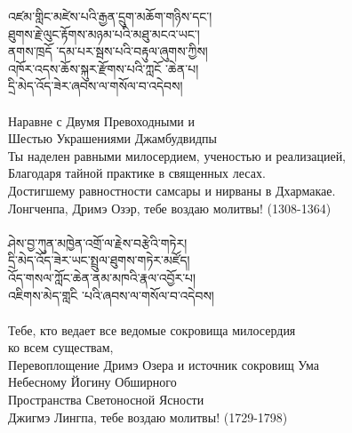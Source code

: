 {\ti
འཛམ་གླིང་མཛེས་པའི་རྒྱན་དྲུག་མཆོག་གཉིས་དང་། \\
ཐུགས་རྗེ་ལུང་རྟོགས་མཉམ་པའི་མཐུ་མངའ་ཡང་། \\
ནགས་ཁྲདོ ་དམ་པར་སྦས་པའི་བརྟུལ་ཞུགས་ཀྱིས། \\
འཁོར་འདས་ཆོས་སྐུར་རྫོགས་པའི་ཀླངོ ་ཆེན་པ། \\
དྲི་མེད་འོད་ཟེར་ཞབས་ལ་གསོལ་བ་འདེབས།}\\
\\
\ru
Наравне с Двумя Превоходными и \\
Шестью Украшениями Джамбудвидпы\\
Ты наделен равными милосердием, ученостью и реализацией,\\
Благодаря тайной практике в священных лесах.\\
Достигшему равностности самсары и нирваны в Дхармакае.\\
Лонгченпа, Дримэ Озэр, тебе воздаю молитвы! (1308-1364)\\
\\
\newpage
{\ti
ཤེས་བྱ་ཀུན་མཁྱེན་འགྲོ་ལ་རྗེས་བརྩེའི་གཏེར། \\
དྲི་མེད་འོད་ཟེར་ཡང་སྤྲུལ་ཐུགས་གཏེར་མཛོད། \\
འོད་གསལ་ཀློང་ཆེན་ནམ་མཁའི་རྣལ་འབྱོར་པ། \\
འཇིགས་མེད་གླངི ་པའི་ཞབས་ལ་གསོལ་བ་འདེབས།}\\
\\
\ru
Тебе, кто ведает все ведомые сокровища милосердия\\
\indent ко всем существам,\\
Перевоплощение Дримэ Озера и источник сокровищ Ума \\
Небесному Йогину Обширного \\
Пространства Светоносной Ясности\\
Джигмэ Лингпа, тебе воздаю молитвы! (1729-1798)\\

